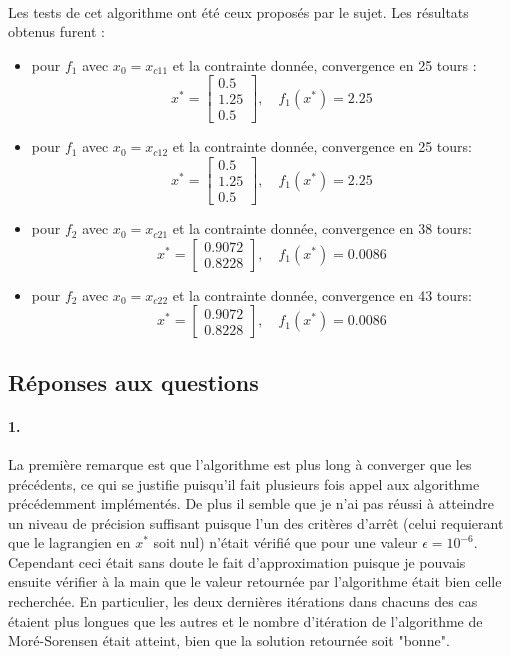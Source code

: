 \documentclass[12pt]{article}	%
\begin{document}
\paragraph{}
Les tests de cet algorithme ont été ceux proposés par le sujet. Les résultats obtenus furent :
\begin{itemize}
	\item pour $f_1$ avec $x_0 = x_{c11}$ et la contrainte donnée, convergence en 25 tours :
		\[x^* = \left[\begin{array}{c}0.5\\1.25\\0.5\end{array}\right],\quad f_1(x^*) = 2.25\]
	\item pour $f_1$ avec $x_0 = x_{c12}$ et la contrainte donnée, convergence en 25 tours:
		\[x^* = \left[\begin{array}{c}0.5\\1.25\\0.5\end{array}\right],\quad f_1(x^*) = 2.25\]
	\item pour $f_2$ avec $x_0 = x_{c21}$ et la contrainte donnée, convergence en 38 tours:
		\[x^* = \left[\begin{array}{c}0.9072\\0.8228\end{array}\right],\quad f_1(x^*) = 0.0086\]
	\item pour $f_2$ avec $x_0 = x_{c22}$ et la contrainte donnée, convergence en 43 tours:
		\[x^* = \left[\begin{array}{c}0.9072\\0.8228\end{array}\right],\quad f_1(x^*) = 0.0086\]
\end{itemize}

\subsection{Réponses aux questions}
\paragraph{1.}
La première remarque est que l'algorithme est plus long à converger que les précédents, ce qui se justifie puisqu'il fait plusieurs fois appel aux algorithme précédemment implémentés. De plus il semble que je n'ai pas réussi à atteindre un niveau de précision suffisant puisque l'un des critères d'arrêt (celui requierant que le lagrangien en $x^*$ soit nul) n'était vérifié que pour une valeur $\epsilon = 10^{-6}$. Cependant ceci était sans doute le fait d'approximation puisque je pouvais ensuite vérifier à la main que le valeur retournée par l'algorithme était bien celle recherchée. En particulier, les deux dernières itérations dans chacuns des cas étaient plus longues que les autres et le nombre d'itération de l'algorithme de Moré-Sorensen était atteint, bien que la solution retournée soit "bonne".
\end{document}
